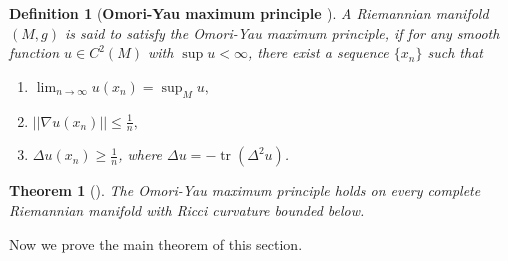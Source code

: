 \documentclass[pdflatex,sn-mathphys-num]{sn-jnl}%
\theoremstyle{thmstyleone}%
\newtheorem{theorem}{Theorem}%
\theoremstyle{thmstyletwo}%
\theoremstyle{thmstylethree}%
\newtheorem{definition}{Definition}%
\begin{document}
\vspace{0.15in}

\begin{definition}[\textbf{Omori-Yau maximum principle \cite[\boldmath p. $486$]{PRS}}]
    A Riemannian manifold $(M,g)$ is said to satisfy 
	the {\it Omori-Yau maximum principle}, if for any smooth function $u\in C^2(M)$ with $\sup u < \infty$,  there exist a sequence $\{x_n\}$ such that
	\begin{enumerate}
		\item[\emph{(i)}] $\displaystyle{\lim_{n \to \infty}}u(x_n)={\sup}_{M} u,$\\
		\item[\emph{(ii)}] $||\nabla u(x_n)|| \leq \frac{1}{n},$ \\
		\item[\emph{(iii)}] $\Delta u(x_n)\ge \frac{1}{n}$, where $\Delta u = -\operatorname{tr}(\Delta^2 u)$.
	\end{enumerate}
\end{definition}
	
\vspace{0.15in}	

	\begin{theorem}[\textbf{\cite[\boldmath p. $486$]{PRS}}] \label{rbb}
		The Omori-Yau maximum principle holds on every complete Riemannian 
		manifold with Ricci curvature bounded below.
	\end{theorem}
	
\vspace{0.15in}

Now we prove the main theorem of this section.

\vspace{0.15in}
\end{document}
